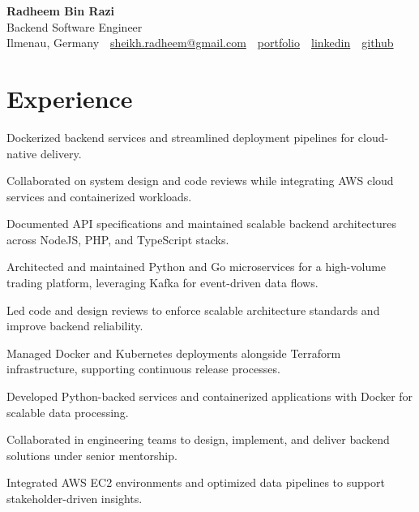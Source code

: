 \documentclass[11pt,a4paper]{resume}
\makeatletter
\newcommand{\Portfolio}{https://radheem.github.io/my-cv}
\newcommand{\PortfolioText}{portfolio}
\newcommand{\GitHub}{https://github.com/radheem}
\newcommand{\LinkedIn}{https://www.linkedin.com/in/radheem-razi}
\newcommand{\Email}{sheikh.radheem@gmail.com}
\makeatother
\begin{document}
\begin{center}
  {\huge\bfseries Radheem Bin Razi}\\[3pt]
  {\large Backend Software Engineer}\\[6pt]
  \small
  Ilmenau, Germany \,\textbar\,
  \href{mailto:\Email}{\Email} \,\textbar\,
  \href{\Portfolio}{\PortfolioText} \,\textbar\,
  \href{\LinkedIn}{linkedin} \,\textbar\,
  \href{\GitHub}{github}
\end{center}
\vspace{2pt}

\section{Experience}

\bullets
  \item Dockerized backend services and streamlined deployment pipelines for cloud-native delivery.
  \item Collaborated on system design and code reviews while integrating AWS cloud services and containerized workloads.
  \item Documented API specifications and maintained scalable backend architectures across NodeJS, PHP, and TypeScript stacks.
\bulletsend
\vspace{3pt}
\bullets
  \item Architected and maintained Python and Go microservices for a high-volume trading platform, leveraging Kafka for event-driven data flows.
  \item Led code and design reviews to enforce scalable architecture standards and improve backend reliability.
  \item Managed Docker and Kubernetes deployments alongside Terraform infrastructure, supporting continuous release processes.
\bulletsend
\vspace{3pt}
\bullets
  \item Developed Python-backed services and containerized applications with Docker for scalable data processing.
  \item Collaborated in engineering teams to design, implement, and deliver backend solutions under senior mentorship.
  \item Integrated AWS EC2 environments and optimized data pipelines to support stakeholder-driven insights.
\bulletsend
\vspace{3pt}
\end{document}
